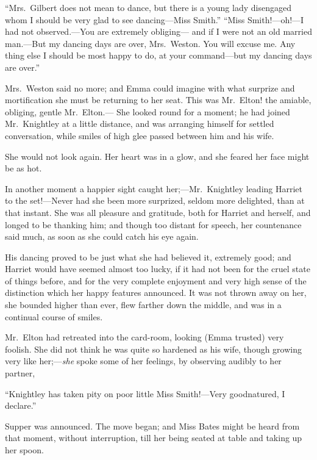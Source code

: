 ``Mrs.\ Gilbert does not mean to dance, but there is a young lady
disengaged whom I should be very glad to see dancing---Miss Smith.''
``Miss Smith!---oh!---I had not observed.---You are extremely obliging---%
and if I were not an old married man.---But my dancing days are over,
Mrs.\ Weston.  You will excuse me.  Any thing else I should be most happy
to do, at your command---but my dancing days are over.''

Mrs.\ Weston said no more; and Emma could imagine with what
surprize and mortification she must be returning to her seat.
This was Mr.\ Elton! the amiable, obliging, gentle Mr.\ Elton.---%
She looked round for a moment; he had joined Mr.\ Knightley at a
little distance, and was arranging himself for settled conversation,
while smiles of high glee passed between him and his wife.

She would not look again.  Her heart was in a glow, and she feared
her face might be as hot.

In another moment a happier sight caught her;---Mr.\ Knightley
leading Harriet to the set!---Never had she been more surprized,
seldom more delighted, than at that instant.  She was all pleasure
and gratitude, both for Harriet and herself, and longed to be
thanking him; and though too distant for speech, her countenance
said much, as soon as she could catch his eye again.

His dancing proved to be just what she had believed it,
extremely good; and Harriet would have seemed almost too lucky,
if it had not been for the cruel state of things before, and for
the very complete enjoyment and very high sense of the distinction
which her happy features announced.  It was not thrown away on her,
she bounded higher than ever, flew farther down the middle,
and was in a continual course of smiles.

Mr.\ Elton had retreated into the card-room, looking (Emma trusted)
very foolish.  She did not think he was quite so hardened as his wife,
though growing very like her;---\emph{she} spoke some of her feelings,
by observing audibly to her partner,

``Knightley has taken pity on poor little Miss Smith!---Very goodnatured,
I declare.''

Supper was announced.  The move began; and Miss Bates might be
heard from that moment, without interruption, till her being
seated at table and taking up her spoon.

